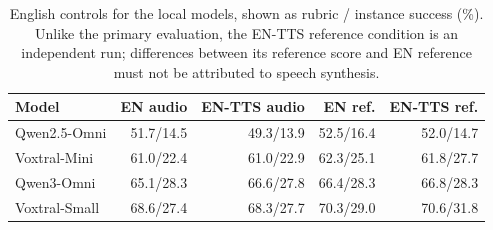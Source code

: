 \begin{table}[htbp]
\centering
\caption{English controls for the local models, shown as rubric / instance success (\%). Unlike the primary evaluation, the EN-TTS reference condition is an independent run; differences between its reference score and EN reference must not be attributed to speech synthesis.}
\label{tab:open_english}
\begingroup
\fontsize{8.5}{10.2}\selectfont
\setlength{\tabcolsep}{1pt}
\renewcommand{\arraystretch}{1.06}
\begin{tabular*}{\linewidth}{@{}l@{\extracolsep{\fill}}rrrr@{}}
\toprule
\textbf{Model} & \textbf{EN audio} & \textbf{EN-TTS audio} & \textbf{EN ref.} & \textbf{EN-TTS ref.} \\
\midrule
Qwen2.5-Omni & 51.7/14.5 & 49.3/13.9 & 52.5/16.4 & 52.0/14.7 \\
Voxtral-Mini & 61.0/22.4 & 61.0/22.9 & 62.3/25.1 & 61.8/27.7 \\
Qwen3-Omni & 65.1/28.3 & 66.6/27.8 & 66.4/28.3 & 66.8/28.3 \\
Voxtral-Small & 68.6/27.4 & 68.3/27.7 & 70.3/29.0 & 70.6/31.8 \\
\bottomrule
\end{tabular*}
\endgroup
\end{table}

